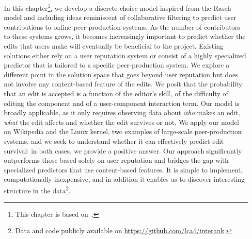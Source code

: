 
In this chapter\footnote{This chapter is based on~\citet{yardim2018can}.}, we develop a discrete-choice model inspired from the Rasch model and including ideas reminiscent of collaborative filtering to predict user contributions to online peer-production systems.
As the number of contributors to these systems grows, it becomes increasingly important to predict whether the edits that users make will eventually be beneficial to the project.
Existing solutions either rely on a user reputation system or consist of a highly specialized predictor that is tailored to a specific peer-production system.
We explore a different point in the solution space that goes beyond user reputation but does not involve any content-based feature of the edits.
We posit that the probability that an edit is accepted is a function of the editor's skill, of the difficulty of editing the component and of a user-component interaction term.
Our model is broadly applicable, as it only requires observing data about \emph{who} makes an edit, \emph{what} the edit affects and whether the edit survives or not.
We apply our model on Wikipedia and the Linux kernel, two examples of large-scale peer-production systems, and we seek to understand whether it can effectively predict edit survival:
in both cases, we provide a positive answer.
Our approach significantly outperforms those based solely on user reputation and bridges the gap with specialized predictors that use content-based features.
It is simple to implement, computationally inexpensive, and in addition it enables us to discover interesting structure in the data\footnote{Data and code publicly available on \href{https://github.com/lca4/interank}{https://github.com/lca4/interank}.}.

